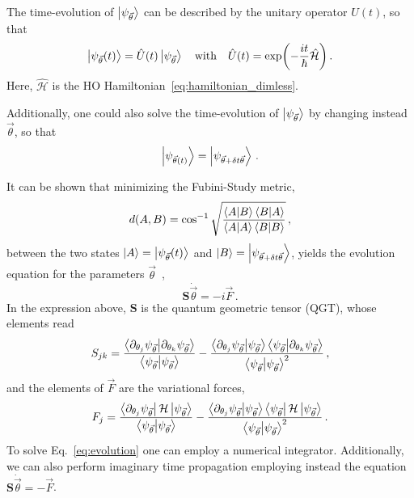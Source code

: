 \documentclass[aps,pre,superscriptaddress,amsmath,amssymb,amsfonts,twocolumn,showpacs,notitlepage]{revtex4-1}
\begin{document}
	The time-evolution of $\ket{\psi_{\vec{\theta}}}$ can be described by the unitary operator $\hat{U}(t)$, so that
	\begin{equation}
		\ket{\psi_{\vec{\theta}}(t)} = \hat{U}(t)\ket{\psi_{\vec{\theta}}} \qq{with} \hat{U}(t)=\exp(-\frac{it}{\hbar}\hat{\mathcal{H}}) \,.
	\end{equation}
	Here, $\hat{\mathcal{H}}$ is the HO Hamiltonian~\eqref{eq:hamiltonian_dimless}.
	
	Additionally, one could also solve the time-evolution of $\ket{\psi_{\vec{\theta}}}$ by changing instead $\vec{\theta}$, so that
	\begin{equation}
		\ket{\psi_{\vec{\theta}(t)}} = \ket{\psi_{\vec{\theta} + \delta t\vec{\theta}}} \,.
	\end{equation}
	
	It can be shown that minimizing the Fubini-Study metric,
	\begin{equation} \label{eq:fubini_metric}
		d(A,B) = \cos^{-1}\sqrt{\frac{\braket{A}{B}\braket{B}{A}}{\braket{A}{A}\braket{B}{B}}} \,,
	\end{equation}
	between the two states $\ket{A}=\ket{\psi_{\vec{\theta}}(t)}$ and $\ket{B}=\ket{\psi_{\vec{\theta} + \delta t\vec{\theta}}}$, yields the evolution equation for the parameters $\vec{\theta}$~\cite{Sinibaldi2023},
	\begin{equation} \label{eq:evolution}
		\bm{S}\dot{\vec{\theta}} = -i\vec{F} \,.
	\end{equation}
	In the expression above, $\bm{S}$ is the quantum geometric tensor (QGT), whose elements read
	\begin{equation}
		S_{jk} = \frac{\braket{\partial_{\theta_j}{\psi_{\vec{\theta}}}}{\partial_{\theta_k}{\psi_{\vec{\theta}}}}}{\braket{\psi_{\vec{\theta}}}} - \frac{\braket{\partial_{\theta_j}\psi_{\vec{\theta}}}{\psi_{\vec{\theta}}}\braket{\psi_{\vec{\theta}}}{\partial_{\theta_k}\psi_{\vec{\theta}}}}{\braket{\psi_{\vec{\theta}}}^2} \,,
	\end{equation}
	and the elements of $\vec{F}$ are the variational forces,
	\begin{equation}
		F_j = \frac{\bra{\partial_{\theta_j}\psi_{\vec{\theta}}}\mathcal{H}\ket{\psi_{\vec{\theta}}}}{\braket{\psi_{\vec{\theta}}}} - \frac{\braket{\partial_{\theta_j}\psi_{\vec{\theta}}}{\psi_{\vec{\theta}}}\bra{\psi_{\vec{\theta}}}\mathcal{H}\ket{\psi_{\vec{\theta}}}}{\braket{\psi_{\vec{\theta}}}^2} \,.
	\end{equation}
	To solve Eq.~\eqref{eq:evolution} one can employ a numerical integrator.
	Additionally, we can also perform imaginary time propagation employing instead the equation $\bm{S}\dot{\vec{\theta}} = -\vec{F}$.
\end{document}
